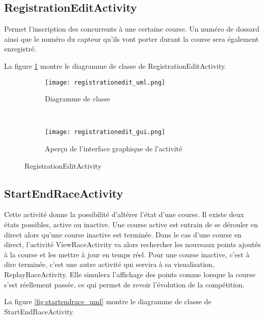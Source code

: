 \subsection{RegistrationEditActivity}

Permet l'inscription des concurrents à une certaine course. Un numéro de dossard ainsi que le numéro du capteur qu'ils vont porter durant la course sera également enregistré.

La figure \ref{fig:registrationedit_uml} montre le diagramme de classe de RegistrationEditActivity.

\begin{figure}[htb!]
    \centering
    \begin{subfigure}[htb]{0.49\textwidth}
		\texttt{[image: registrationedit\_uml.png]} 
		\caption{Diagramme de classe}
		\label{fig:registrationedit_uml}
    \end{subfigure}
    ~ %
    \begin{subfigure}[htb]{0.49\textwidth}
		\texttt{[image: registrationedit\_gui.png]} 
		\caption{Aperçu de l'interface graphique de l'activité}
		\label{fig:registrationedit_gui}
    \end{subfigure}
    \caption{RegistrationEditActivity}\label{fig:registrationedit_fig}
\end{figure}

\subsection{StartEndRaceActivity}

Cette activité donne la possibilité d'altérer l'état d'une course. Il existe deux états possibles, active ou inactive. Une course active est entrain de se dérouler en direct alors qu'une course inactive est terminée. Dans le cas d'une course en direct, l'activité ViewRaceActivity va alors rechercher les nouveaux points ajoutés à la course et les mettre à jour en temps réel. Pour une course inactive, c'est à dire terminée, c'est une autre activité qui servira à sa visualisation, ReplayRaceActivity. Elle simulera l'affichage des points comme lorsque la course s'est réellement passée, ce qui permet de revoir l'évolution de la compétition.

La figure \ref{fig:startendrace_uml} montre le diagramme de classe de StartEndRaceActivity.

